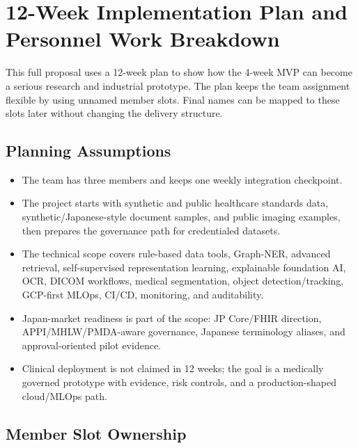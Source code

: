 \section{12-Week Implementation Plan and Personnel Work Breakdown}

This full proposal uses a 12-week plan to show how the 4-week MVP can become a serious research and industrial prototype. The plan keeps the team assignment flexible by using unnamed member slots. Final names can be mapped to these slots later without changing the delivery structure.

\subsection{Planning Assumptions}

\begin{itemize}
  \item The team has three members and keeps one weekly integration checkpoint.
  \item The project starts with synthetic and public healthcare standards data, synthetic/Japanese-style document samples, and public imaging examples, then prepares the governance path for credentialed datasets.
  \item The technical scope covers rule-based data tools, Graph-NER, advanced retrieval, self-supervised representation learning, explainable foundation AI, OCR, DICOM workflows, medical segmentation, object detection/tracking, GCP-first MLOps, CI/CD, monitoring, and auditability.
  \item Japan-market readiness is part of the scope: JP Core/FHIR direction, APPI/MHLW/PMDA-aware governance, Japanese terminology aliases, and approval-oriented pilot evidence.
  \item Clinical deployment is not claimed in 12 weeks; the goal is a medically governed prototype with evidence, risk controls, and a production-shaped cloud/MLOps path.
\end{itemize}

\subsection{Member Slot Ownership}

